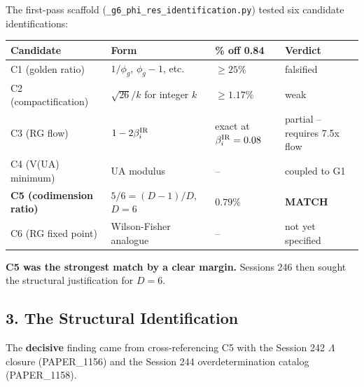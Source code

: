 \documentclass[
]{article}
\newcounter{none} %
\begin{document}
The first-pass scaffold (\texttt{\_g6\_phi\_res\_identification.py})
tested six candidate identifications:

{\def\LTcaptype{none} %
\begin{longtable}[]{@{}
  >{\raggedright\arraybackslash}p{}
  >{\raggedright\arraybackslash}p{}
  >{\raggedleft\arraybackslash}p{}
  >{\raggedright\arraybackslash}p{}@{}}
\toprule\noalign{}
\begin{minipage}[b]{\linewidth}\raggedright
Candidate
\end{minipage} & \begin{minipage}[b]{\linewidth}\raggedright
Form
\end{minipage} & \begin{minipage}[b]{\linewidth}\raggedleft
\% off 0.84
\end{minipage} & \begin{minipage}[b]{\linewidth}\raggedright
Verdict
\end{minipage} \\
\midrule\noalign{}
\endhead
\bottomrule\noalign{}
\endlastfoot
C1 (golden ratio) & \(1/\phi_g\), \(\phi_g - 1\), etc. & \(\geq 25\%\) &
falsified \\
C2 (compactification) & \(\sqrt{26}/k\) for integer \(k\) &
\(\geq 1.17\%\) & weak \\
C3 (RG flow) & \(1 - 2\beta_i^{\rm IR}\) & exact at
\(\beta_i^{\rm IR} = 0.08\) & partial -- requires 7.5x flow \\
C4 (V(UA) minimum) & UA modulus & -- & coupled to G1 \\
\textbf{C5 (codimension ratio)} & \(5/6 = (D-1)/D\), \(D=6\) &
\(0.79\%\) & \textbf{MATCH} \\
C6 (RG fixed point) & Wilson-Fisher analogue & -- & not yet specified \\
\end{longtable}
}

\textbf{C5 was the strongest match by a clear margin.} Sessions 246 then
sought the structural justification for \(D = 6\).

\subsection{3. The Structural
Identification}\label{the-structural-identification}

The \textbf{decisive} finding came from cross-referencing C5 with the
Session 242 \(\Lambda\) closure (PAPER\_1156) and the Session 244
overdetermination catalog (PAPER\_1158).
\end{document}
